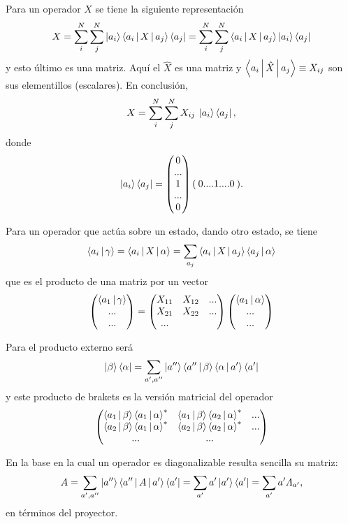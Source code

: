 \documentclass[10pt,oneside]{CBFT_book}
\begin{document}
Para un operador $X$ se tiene la siguiente representación
\[
	X = \sum_i^N \sum_j^N \Ket{a_i} \Braket{a_i|X|a_j} \Bra{a_j} =
		\sum_i^N \sum_j^N  \Braket{a_i|X|a_j} \Ket{a_i} \Bra{a_j}
\]
y esto último es una matriz. Aquí el $\hat{X}$ es una matriz y 
$\Braket{a_i|\hat{X}|a_j} \equiv X_{ij}$ son sus elementillos (escalares).
En conclusión,
\[
	X = \sum_i^N \sum_j^N X_{ij} \: \Ket{a_i} \Bra{a_j},
\]
donde 
\[
	\Ket{a_i} \Bra{a_j} = \begin{pmatrix}
	 0 \\
	 ... \\
	 1 \\
	 ... \\
	 0
	\end{pmatrix}
	(\: 0 .... 1 .... 0 \:).
\]

Para un operador que actúa sobre un estado, dando otro estado, se tiene
\[
	\Braket{a_i|\gamma} = \Braket{a_i|X|\alpha} = \sum_{a_j} \Braket{a_i|X|a_j}\Braket{a_j|\alpha}
\]
que es el producto de una matriz por un vector
\[
	\begin{pmatrix}
	 \Braket{a_1|\gamma} \\
	 ... \\
	 ... \\
	\end{pmatrix} = 
	\begin{pmatrix}
	 X_{11} & X_{12} & ...\\
	 X_{21} & X_{22} & ... \\
	 ... \\
	\end{pmatrix}
	\begin{pmatrix}
	 \Braket{a_1|\alpha} \\
	 ... \\
	 ... \\	 
	\end{pmatrix}
\]

Para el producto externo será
\[
	\Ket{\beta}\Bra{\alpha} = \sum_{a',a''} \Ket{a''} \Braket{a''|\beta} \Braket{\alpha|a'} \Bra{a'}
\]
y este producto de brakets es la versión matricial del operador
\[
	\begin{pmatrix}	
	\Braket{a_1|\beta} \Braket{a_1|\alpha}^* & \Braket{a_1|\beta} \Braket{a_2|\alpha}^* & ... \\
	\Braket{a_2|\beta} \Braket{a_1|\alpha}^* & \Braket{a_2|\beta} \Braket{a_2|\alpha}^* & ... \\
	... & ... & 
	\end{pmatrix}
\]

En la base en la cual un operador es diagonalizable resulta sencilla su matriz:
\[
	A = \sum_{a',a''}  \Ket{a''} \Braket{a''|A|a'} \Bra{a'} = 
	\sum_{a'}  a' \Ket{a'} \Bra{a'} = \sum_{a'}  a' \Lambda_{a'},
\]
en términos del proyector.
\end{document}
